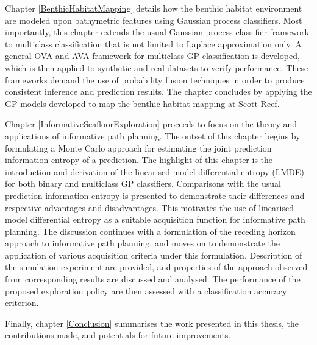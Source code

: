 		Chapter \ref{BenthicHabitatMapping} details how the benthic habitat environment are modeled upon bathymetric features using Gaussian process classifiers. Most importantly, this chapter extends the usual Gaussian process classifier framework to multiclass classification that is not limited to Laplace approximation only. A general OVA and AVA framework for multiclass GP classification is developed, which is then applied to synthetic and real datasets to verify performance. These frameworks demand the use of probability fusion techniques in order to produce consistent inference and prediction results. The chapter concludes by applying the GP models developed to map the benthic habitat mapping at Scott Reef.
		
		Chapter \ref{InformativeSeafloorExploration} proceeds to focus on the theory and applications of informative path planning. The outset of this chapter begins by formulating a Monte Carlo approach for estimating the joint prediction information entropy of a prediction. The highlight of this chapter is the introduction and derivation of the linearised model differential entropy (LMDE) for both binary and multiclass GP classifiers. Comparisons with the usual prediction information entropy is presented to demonstrate their differences and respective advantages and disadvantages. This motivates the use of linearised model differential entropy as a suitable acquisition function for informative path planning. The discussion continues with a formulation of the receding horizon approach to informative path planning, and moves on to demonstrate the application of various acquisition criteria under this formulation. Description of the simulation experiment are provided, and properties of the approach observed from corresponding results are discussed and analysed. The performance of the proposed exploration policy are then assessed with a classification accuracy criterion.
		
		Finally, chapter \ref{Conclusion} summarises the work presented in this thesis, the contributions made, and potentials for future improvements.